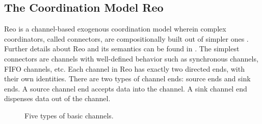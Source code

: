 \documentclass{llncs}
\begin{document}
\subsection{The Coordination Model Reo}
Reo is a channel-based exogenous coordination model wherein complex coordinators, called connectors,
are compositionally built out of simpler ones \cite{Arb04}.
Further details about Reo and its semantics can be found in \cite{Arb04,AR03,BSAR06}.
The simplest connectors are channels with well-defined behavior such as synchronous channels, FIFO channels, etc.
Each channel in Reo has exactly two directed ends, with their own identities.
There are two types of channel ends: source ends and sink ends. A source channel end accepts
data into the channel. A sink channel end dispenses data out of the channel.
\begin{figure}
  \centering
  \vspace{-6mm}
  \caption{Five types of basic channels.}\label{fig:basicchannel}
\end{figure}
\end{document}
